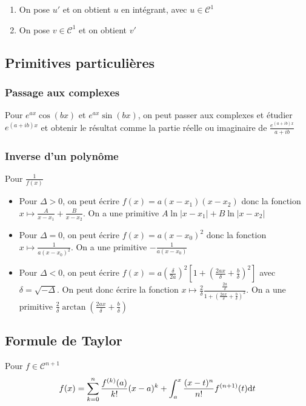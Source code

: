 \documentclass[openany]{book}
\begin{document}
\begin{enumerate}
    \item On pose $u'$ et on obtient $u$ en intégrant, avec $u \in \mathcal{C}^1$
    \item On pose $v \in \mathcal{C}^1$ et on obtient $v'$
\end{enumerate}

\subsection{Primitives particulières}

\subsubsection{Passage aux complexes}
Pour $e^{ax}\cos{(bx)}$ et $e^{ax}\sin{(bx)}$, on peut passer aux complexes et étudier $e^{(a+ib)x}$ et obtenir le résultat comme la partie réelle ou imaginaire de $ \frac{e^{(a+ib)x}}{a+ib} $

\subsubsection{Inverse d'un polynôme}
Pour $\frac{1}{f(x)}$
\begin{itemize}
    \item Pour $\Delta > 0$, on peut écrire $f(x) = a(x-x_1)(x-x_2)$ donc la fonction $ x \mapsto \frac{A}{x-x_1}+\frac{B}{x-x_2} $. On a une primitive $A \ln{|x -  x_1|} + B \ln{|x - x_2|}$
    \item Pour $\Delta = 0$, on peut écrire $f(x) = a(x-x_0)^2$ donc la fonction $ x \mapsto \frac{1}{a(x-x_0)^2}$. On a une primitive $-\frac{1}{a(x-x_0)}$
    \item Pour $\Delta < 0$, on peut écrire $f(x) = a (\frac{\delta}{2a})^2 [1 + (\frac{2ax}{\delta} + \frac{b}{\delta})^2] $ avec $\delta = \sqrt{-\Delta}$. On peut donc écrire la fonction $x \mapsto \frac{2}{\delta} \frac{\frac{2a}{\delta}}{1 + (\frac{2ax}{\delta} + \frac{b}{\delta})^2} $. On a une primitive $ \frac{2}{\delta} \arctan{(\frac{2ax}{\delta} + \frac{b}{\delta})} $
\end{itemize}

\subsection{Formule de Taylor}
Pour $f \in \mathcal{C}^{n+1}$
\[ f(x) = \sum_{k=0}^{n} \frac{f^{(k)}(a)}{k!}(x-a)^k + \int_{a}^{x} \frac{(x-t)^n}{n!}f^{(n+1)} (t) \text{d}t \]
\end{document}
